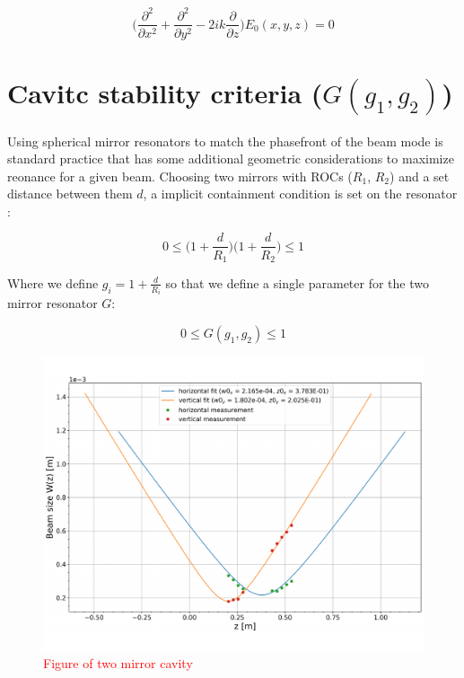 \begin{equation}\label{eq:paraxial}
	\bigg( \frac{\partial^2}{\partial x ^2} + \frac{\partial^2}{\partial y^2} - 2ik \frac{\partial}{\partial z} \bigg) E_0(x,y,z) = 0
\end{equation}

\section{Cavitc stability criteria ($G(g_1,g_2)$)} \label{sec:cavstab}
Using spherical mirror resonators to match the phasefront of the beam mode is standard practice that has some additional geometric considerations to maximize reonance for a given beam. Choosing two mirrors with ROCs ($R_1$, $R_2$) and a set distance between them $d$, a implicit containment condition is set on the resonator \cite{salehteich:2007}:

$$
	0 \leq \bigg(1 + \frac{d}{R_1} \bigg) \bigg(1 + \frac{d}{R_2} \bigg) \leq 1
$$

Where we define $g_i = 1 + \frac{d}{R_i}$ so that we define a single parameter for the two mirror resonator $G$:

\begin{equation}\label{eq:cavstab}
	0 \leq G(g_1,g_2) \leq 1
\end{equation}

\begin{figure}[H]
\includegraphics[width=\textwidth]{figs/ALGAAS/beam_scans/12_18_2020_preMMT.pdf}
\caption{\textcolor{red}{Figure of two mirror cavity}}
\label{fig:cav_stab}
\end{figure}

